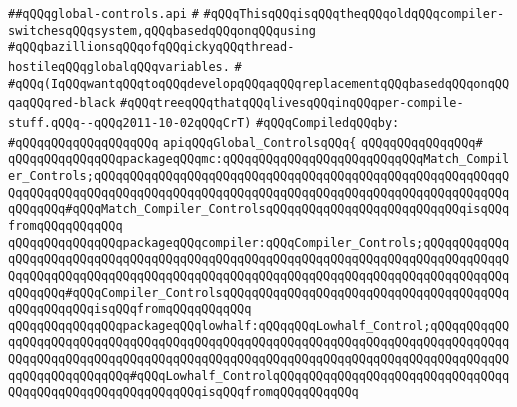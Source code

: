 \label{src/lib/compiler/toplevel/main/global-controls.api}
\verb|##qQQqglobal-controls.api|\newline
\verb|#|\newline
\verb|#qQQqThisqQQqisqQQqtheqQQqoldqQQqcompiler-switchesqQQqsystem,qQQqbasedqQQqonqQQqusing|\newline
\verb|#qQQqbazillionsqQQqofqQQqickyqQQqthread-hostileqQQqglobalqQQqvariables.|\newline
\verb|#|\newline
\verb|#qQQq(IqQQqwantqQQqtoqQQqdevelopqQQqaqQQqreplacementqQQqbasedqQQqonqQQqaqQQqred-black|\newline
\verb|#qQQqtreeqQQqthatqQQqlivesqQQqinqQQqper-compile-stuff.qQQq--qQQq2011-10-02qQQqCrT)|\newline
\newline
\verb|#qQQqCompiledqQQqby:|\newline
\verb|#qQQqqQQqqQQqqQQqqQQq|\newline
\newline
\newline
\newline
\verb|apiqQQqGlobal_ControlsqQQq{|\newline
\verb|qQQqqQQqqQQqqQQq#|\newline
\verb|qQQqqQQqqQQqqQQqpackageqQQqmc:qQQqqQQqqQQqqQQqqQQqqQQqqQQqMatch_Compiler_Controls;qQQqqQQqqQQqqQQqqQQqqQQqqQQqqQQqqQQqqQQqqQQqqQQqqQQqqQQqqQQqqQQqqQQqqQQqqQQqqQQqqQQqqQQqqQQqqQQqqQQqqQQqqQQqqQQqqQQqqQQqqQQqqQQqqQQqqQQq#qQQqMatch_Compiler_ControlsqQQqqQQqqQQqqQQqqQQqqQQqqQQqisqQQqfromqQQqqQQqqQQq|\newline
\verb|qQQqqQQqqQQqqQQqpackageqQQqcompiler:qQQqCompiler_Controls;qQQqqQQqqQQqqQQqqQQqqQQqqQQqqQQqqQQqqQQqqQQqqQQqqQQqqQQqqQQqqQQqqQQqqQQqqQQqqQQqqQQqqQQqqQQqqQQqqQQqqQQqqQQqqQQqqQQqqQQqqQQqqQQqqQQqqQQqqQQqqQQqqQQqqQQqqQQqqQQq#qQQqCompiler_ControlsqQQqqQQqqQQqqQQqqQQqqQQqqQQqqQQqqQQqqQQqqQQqqQQqqQQqisqQQqfromqQQqqQQqqQQq|\newline
\verb|qQQqqQQqqQQqqQQqpackageqQQqlowhalf:qQQqqQQqLowhalf_Control;qQQqqQQqqQQqqQQqqQQqqQQqqQQqqQQqqQQqqQQqqQQqqQQqqQQqqQQqqQQqqQQqqQQqqQQqqQQqqQQqqQQqqQQqqQQqqQQqqQQqqQQqqQQqqQQqqQQqqQQqqQQqqQQqqQQqqQQqqQQqqQQqqQQqqQQqqQQqqQQqqQQqqQQq#qQQqLowhalf_ControlqQQqqQQqqQQqqQQqqQQqqQQqqQQqqQQqqQQqqQQqqQQqqQQqqQQqqQQqqQQqisqQQqfromqQQqqQQqqQQq|\newline

